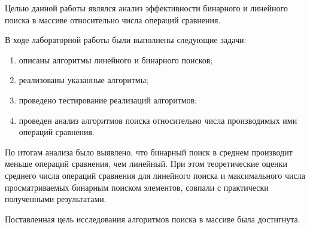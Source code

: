 
Целью данной работы являлся анализ эффективности бинарного и линейного поиска в массиве относительно числа операций сравнения.

В ходе лабораторной работы были выполнены следующие задачи:
\begin{enumerate}[label={\arabic*)}]
	\item описаны алгоритмы линейного и бинарного поисков;
	\item реализованы указанные алгоритмы;
	\item проведено тестирование реализаций алгоритмов;
	\item проведен анализ алгоритмов поиска относительно числа производимых ими операций сравнения.
\end{enumerate}

По итогам анализа было выявлено, что бинарный поиск в среднем производит меньше операций сравнения, чем линейный. При этом теоретические оценки среднего числа операций сравнения для линейного поиска и максимального числа просматриваемых бинарным поиском элементов, совпали с практически полученными результатами.

Поставленная цель исследования алгоритмов поиска в массиве была достигнута.